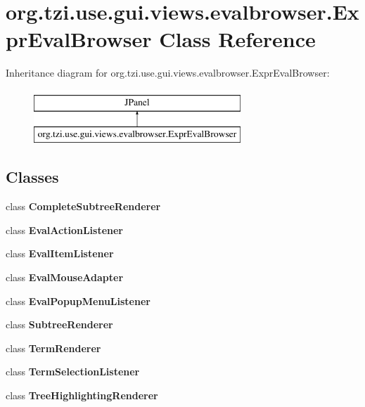 \hypertarget{classorg_1_1tzi_1_1use_1_1gui_1_1views_1_1evalbrowser_1_1_expr_eval_browser}{\section{org.\-tzi.\-use.\-gui.\-views.\-evalbrowser.\-Expr\-Eval\-Browser Class Reference}
\label{classorg_1_1tzi_1_1use_1_1gui_1_1views_1_1evalbrowser_1_1_expr_eval_browser}
}
Inheritance diagram for org.\-tzi.\-use.\-gui.\-views.\-evalbrowser.\-Expr\-Eval\-Browser\-:\begin{figure}[H]
\begin{center}
\leavevmode
\includegraphics[height=2.000000cm]{classorg_1_1tzi_1_1use_1_1gui_1_1views_1_1evalbrowser_1_1_expr_eval_browser}
\end{center}
\end{figure}
\subsection*{Classes}
\begin{DoxyCompactItemize}
\item 
class {\bfseries Complete\-Subtree\-Renderer}
\item 
class {\bfseries Eval\-Action\-Listener}
\item 
class {\bfseries Eval\-Item\-Listener}
\item 
class {\bfseries Eval\-Mouse\-Adapter}
\item 
class {\bfseries Eval\-Popup\-Menu\-Listener}
\item 
class {\bfseries Subtree\-Renderer}
\item 
class {\bfseries Term\-Renderer}
\item 
class {\bfseries Term\-Selection\-Listener}
\item 
class {\bfseries Tree\-Highlighting\-Renderer}
\end{DoxyCompactItemize}

